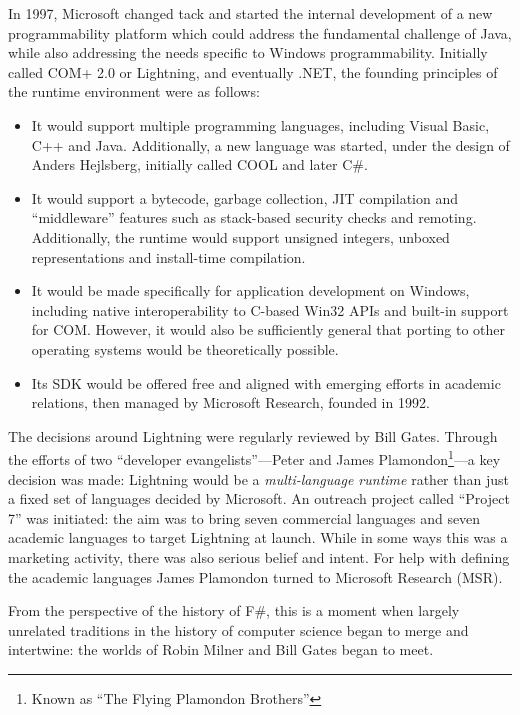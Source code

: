 \documentclass[acmsmall]{acmart}\settopmatter{}
\begin{document}
In 1997, Microsoft changed tack and started the internal development of a new programmability platform which could
address the fundamental challenge of Java, while also addressing the needs specific to Windows programmability.  Initially
called COM+ 2.0 or Lightning, and eventually .NET, the founding principles of the runtime environment were as follows:
\begin{itemize}
\item It would support multiple programming languages, including Visual Basic, C++ and Java. Additionally, a new language was started, under the design of Anders Hejlsberg, initially called COOL and later C\#.
\item It would support a bytecode, garbage collection, JIT compilation and “middleware” features such as stack-based security checks and remoting. Additionally, the runtime would support unsigned integers, unboxed representations and install-time compilation.
\item It would be made specifically for application development on Windows, including native interoperability to C-based Win32 APIs and built-in support for COM. However, it would also be sufficiently general that porting to other operating systems would be theoretically possible.
\item Its SDK would be offered free and aligned with emerging efforts in academic relations, then managed by Microsoft Research, founded in 1992.
\end{itemize}

The decisions around Lightning were regularly reviewed by Bill Gates. Through the efforts of two “developer evangelists”---Peter
and James Plamondon\footnote{ Known as “The Flying Plamondon Brothers”}---a key decision was made: Lightning would
be a \emph{multi-language runtime} rather than just a fixed set of languages decided by Microsoft.  An outreach
project called “Project 7” was initiated: the aim was to bring seven commercial languages and seven academic languages to
target Lightning at launch. While in some ways this was a marketing activity, there was also serious belief and intent.  For
help with defining the academic languages James Plamondon turned to Microsoft Research (MSR).

From the perspective of the history of F\#, this is a moment when largely unrelated traditions in the history of computer science began to merge and intertwine: the worlds of Robin Milner and Bill Gates began to meet.
\end{document}
